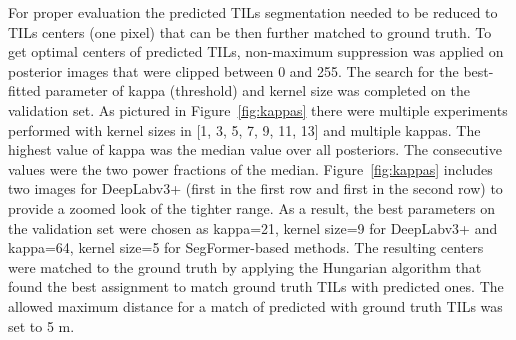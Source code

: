 For proper evaluation the predicted TILs segmentation needed to be reduced to TILs
centers (one pixel) that can be then further matched to ground truth.
To get optimal centers of predicted TILs, non-maximum suppression was applied on
posterior images that were clipped between 0 and 255. The search for the best-fitted
parameter of kappa (threshold) and kernel size was completed on the validation set.
As pictured in Figure~\ref*{fig:kappas} there were multiple experiments performed
with kernel sizes  in [1, 3, 5, 7, 9, 11, 13] and multiple kappas. The highest value of
kappa was the median value over all posteriors. The consecutive values were the
two power fractions of the median. Figure~\ref*{fig:kappas} includes two images
for DeepLabv3+ (first in the first row and first in the second row) to provide a
zoomed look of the tighter range. As a result, the best parameters on the validation
set were chosen as kappa=21, kernel size=9 for DeepLabv3+ and kappa=64, kernel size=5
for SegFormer-based methods. The resulting centers were matched to
the ground truth by applying the Hungarian algorithm that found the best assignment
to match ground truth TILs with predicted ones. The allowed maximum distance for a
match of predicted with ground truth TILs was set to 5 \textmu m.

